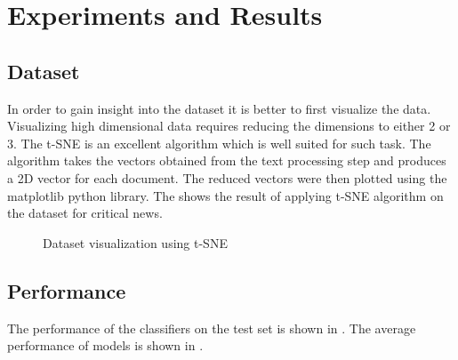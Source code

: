 \chapter{Experiments and Results} \label{result}

\section{Dataset}
In order to gain insight into the dataset it is better to first visualize the data. Visualizing high dimensional data requires reducing the dimensions to either 2 or 3. The t-SNE\cite{maaten2008visualizing} is an excellent algorithm which is well suited for such task. The algorithm takes the vectors obtained from the text processing step and produces a 2D vector for each document. The reduced vectors were then plotted using the matplotlib\cite{hunter2007matplotlib} python library. The  shows the result of applying t-SNE algorithm on the dataset for critical news.

\begin{figure}[h]
    \caption{Dataset visualization using t-SNE}
    \label{fig:dataset}
\end{figure}

\section{Performance}
The performance of the classifiers on the test set is shown in . The average performance of models is shown in .

